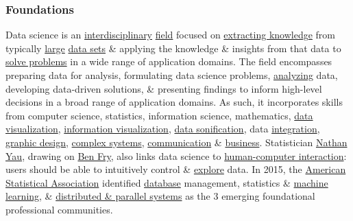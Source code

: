 \documentclass{article}
\begin{document}
\subsubsection{Foundations}
Data science is an \href{https://en.wikipedia.org/wiki/Interdisciplinarity}{interdisciplinary} \href{https://en.wikipedia.org/wiki/Academic_discipline}{field} focused on \href{https://en.wikipedia.org/wiki/Knowledge_extraction}{extracting knowledge} from typically \href{https://en.wikipedia.org/wiki/Big_data}{large} \href{https://en.wikipedia.org/wiki/Data_set}{data sets} \& applying the knowledge \& insights from that data to \href{https://en.wikipedia.org/wiki/Problem-solving}{solve problems} in a wide range of application domains. The field encompasses preparing data for analysis, formulating data science problems, \href{https://en.wikipedia.org/wiki/Analysis}{analyzing} data, developing data-driven solutions, \& presenting findings to inform high-level decisions in a broad range of application domains. As such, it incorporates skills from computer science, statistics, information science, mathematics, \href{https://en.wikipedia.org/wiki/Data_visualization}{data visualization}, \href{https://en.wikipedia.org/wiki/Information_visualization}{information visualization}, \href{https://en.wikipedia.org/wiki/Data_sonification}{data sonification}, data \href{https://en.wikipedia.org/wiki/Data_integration}{integration}, \href{https://en.wikipedia.org/wiki/Graphic_design}{graphic design}, \href{https://en.wikipedia.org/wiki/Complex_systems}{complex systems}, \href{https://en.wikipedia.org/wiki/Communication}{communication} \& \href{https://en.wikipedia.org/wiki/Business}{business}. Statistician \href{https://en.wikipedia.org/wiki/Nathan_Yau}{Nathan Yau}, drawing on \href{https://en.wikipedia.org/wiki/Ben_Fry}{Ben Fry}, also links data science to \href{https://en.wikipedia.org/wiki/Human%E2%80%93computer_interaction}{human-computer interaction}: users should be able to intuitively control \& \href{https://en.wikipedia.org/wiki/Exploration}{explore} data. In 2015, the \href{https://en.wikipedia.org/wiki/American_Statistical_Association}{American Statistical Association} identified \href{https://en.wikipedia.org/wiki/Database}{database} management, statistics \& \href{https://en.wikipedia.org/wiki/Machine_learning}{machine learning}, \& \href{https://en.wikipedia.org/wiki/Distributed_computing}{distributed \& parallel systems} as the 3 emerging foundational professional communities.
\end{document}

